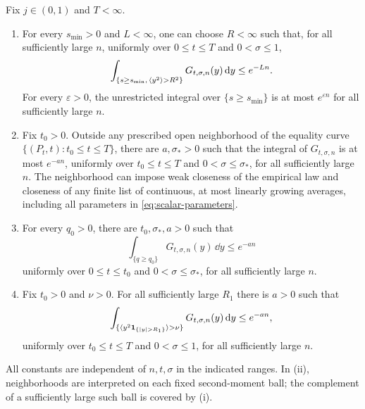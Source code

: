 \begin{lemma}
\label{lem:scalar-rates}
Fix $j\in(0,1)$ and $T<\infty$.
\begin{enumerate}[label=\textup{(\roman*)}]
\item For every $s_{\min}>0$ and $L<\infty$, one can choose $R<\infty$
such that, for all sufficiently large $n$, uniformly over
$0\le t\le T$ and $0<\sigma\le1$,
\[
 \int_{\{s\ge s_{\min},\,\langle y^2\rangle>R^2\}}
 G_{t,\sigma,n}(y)\,\mathrm d y\le e^{-Ln}.
\]
For every $\varepsilon>0$, the unrestricted integral over
$\{s\ge s_{\min}\}$ is at most $e^{\varepsilon n}$ for all
sufficiently large $n$.
\item Fix $t_0>0$.  Outside any prescribed open neighborhood of the
equality curve $\{(P_t,t):t_0\le t\le T\}$, there are
$a,\sigma_*>0$ such that the integral of $G_{t,\sigma,n}$ is at most
$e^{-an}$, uniformly over $t_0\le t\le T$ and
$0<\sigma\le\sigma_*$, for all sufficiently large $n$.
The neighborhood can impose weak closeness of the empirical law and
closeness of any finite list of continuous, at most linearly growing
averages, including all parameters in
\eqref{eq:scalar-parameters}.
\item For every $q_0>0$, there are $t_0,\sigma_*,a>0$ such that
\[
 \int_{\{q\ge q_0\}}G_{t,\sigma,n}(y)\,\dd y\le e^{-an}
\]
uniformly over $0\le t\le t_0$ and $0<\sigma\le\sigma_*$, for all
sufficiently large $n$.
\item Fix $t_0>0$ and $\nu>0$.  For all sufficiently large $R_1$ there
is $a>0$ such that
\[
 \int_{\{\av{y^2\one_{\{|y|>R_1\}}}>\nu\}}
 G_{t,\sigma,n}(y)\,\dd y\le e^{-an},
\]
uniformly over $t_0\le t\le T$ and $0<\sigma\le1$, for all
sufficiently large $n$.
\end{enumerate}
All constants are independent of $n,t,\sigma$ in the indicated ranges.
In \textup{(ii)}, neighborhoods are interpreted on each fixed
second-moment ball; the complement of a sufficiently large such ball
is covered by \textup{(i)}.
\end{lemma}

